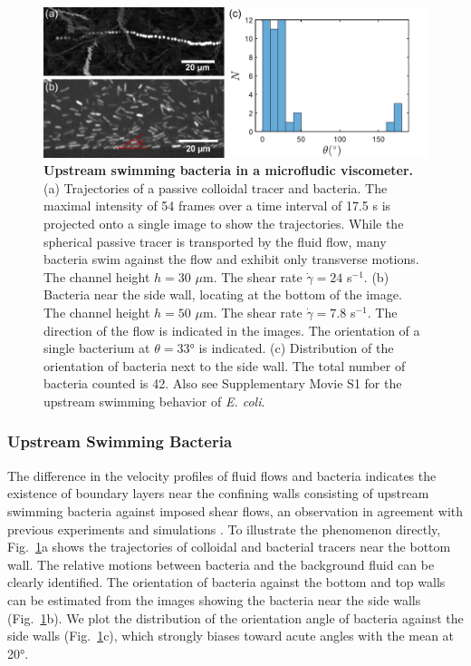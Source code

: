 \begin{figure}[!ht]
	\begin{center}
	\includegraphics[width=5.5 in]{Figs/3-Rheo/4.pdf}
	\end{center}
	\caption[Upstream Swimming Bacteria in a Microfludic Viscometer]
	{
	\textbf{Upstream swimming bacteria in a microfludic viscometer.}
   (a) Trajectories of a passive colloidal tracer and bacteria. The maximal intensity of 54 frames over a time interval of 17.5 s is projected onto a single image to show the trajectories. While the spherical passive tracer is transported by the fluid flow, many bacteria swim against the flow and exhibit only transverse motions. The channel height $h = 30$ $\mu$m. The shear rate $\dot\gamma = 24$ s$^{-1}$.
   (b) Bacteria near the side wall, locating at the bottom of the image. The channel height $h = 50$ $\mu$m. The shear rate $\dot\gamma = 7.8$ s$^{-1}$. The direction of the flow is indicated in the images. The orientation of a single bacterium at $\theta = 33$° is indicated.
   (c) Distribution of the orientation of bacteria next to the side wall. The total number of bacteria counted is 42.
	 Also see Supplementary Movie S1 \cite{suppMovies} for the upstream swimming behavior of \textit{E. coli}.
	}
	\label{fig:3-upstream}
\end{figure}

\subsubsection{Upstream Swimming Bacteria}
The difference in the velocity profiles of fluid flows and bacteria indicates the existence of boundary layers near the confining walls consisting of upstream swimming bacteria against imposed shear flows, an observation in agreement with previous experiments \cite{Hill2007, Kaya2012} and simulations \cite{Costanzo2012, Chilukuri2014, Ezhilan2015, Nash2010}. To illustrate the phenomenon directly, Fig.~\ref{fig:3-upstream}a shows the trajectories of colloidal and bacterial tracers near the bottom wall. The relative motions between bacteria and the background fluid can be
clearly identified. The orientation of bacteria against the bottom and top walls can be estimated from the images showing the bacteria near the side walls (Fig.~\ref{fig:3-upstream}b). We plot the distribution of the orientation angle of bacteria against the side walls (Fig.~\ref{fig:3-upstream}c), which strongly biases toward acute angles with the mean at 20°.

